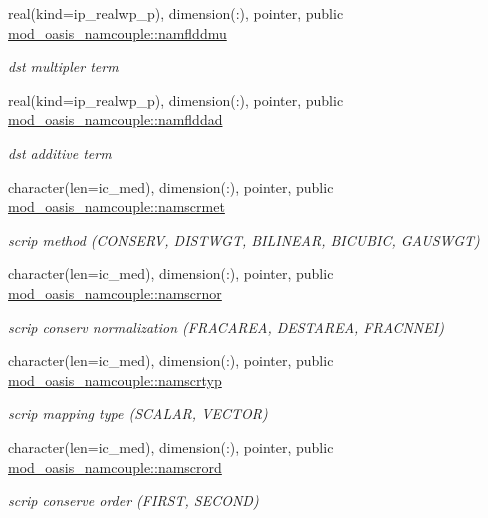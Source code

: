 \begin{DoxyCompactItemize}
real(kind=ip\+\_\+realwp\+\_\+p), dimension(\+:), pointer, public \hyperlink{namespacemod__oasis__namcouple_ad81bb4f19a71f0fcf8655cb9d39a3380}{mod\+\_\+oasis\+\_\+namcouple\+::namflddmu}
\begin{DoxyCompactList}\small\item\em dst multipler term \end{DoxyCompactList}\item 
real(kind=ip\+\_\+realwp\+\_\+p), dimension(\+:), pointer, public \hyperlink{namespacemod__oasis__namcouple_af1e31f45ea1cd7a7b64a8a7dc2cec4ee}{mod\+\_\+oasis\+\_\+namcouple\+::namflddad}
\begin{DoxyCompactList}\small\item\em dst additive term \end{DoxyCompactList}\item 
character(len=ic\+\_\+med), dimension(\+:), pointer, public \hyperlink{namespacemod__oasis__namcouple_a51c19e0892a72acc3dca2adb046ed175}{mod\+\_\+oasis\+\_\+namcouple\+::namscrmet}
\begin{DoxyCompactList}\small\item\em scrip method (C\+O\+N\+S\+E\+RV, D\+I\+S\+T\+W\+GT, B\+I\+L\+I\+N\+E\+AR, B\+I\+C\+U\+B\+IC, G\+A\+U\+S\+W\+GT) \end{DoxyCompactList}\item 
character(len=ic\+\_\+med), dimension(\+:), pointer, public \hyperlink{namespacemod__oasis__namcouple_a392f40531007d5dcc084e6ad4a393fd7}{mod\+\_\+oasis\+\_\+namcouple\+::namscrnor}
\begin{DoxyCompactList}\small\item\em scrip conserv normalization (F\+R\+A\+C\+A\+R\+EA, D\+E\+S\+T\+A\+R\+EA, F\+R\+A\+C\+N\+N\+EI) \end{DoxyCompactList}\item 
character(len=ic\+\_\+med), dimension(\+:), pointer, public \hyperlink{namespacemod__oasis__namcouple_a8ddbaabd22bbf485888b1df5f3578909}{mod\+\_\+oasis\+\_\+namcouple\+::namscrtyp}
\begin{DoxyCompactList}\small\item\em scrip mapping type (S\+C\+A\+L\+AR, V\+E\+C\+T\+OR) \end{DoxyCompactList}\item 
character(len=ic\+\_\+med), dimension(\+:), pointer, public \hyperlink{namespacemod__oasis__namcouple_ac881ced105604879ada860fabd677481}{mod\+\_\+oasis\+\_\+namcouple\+::namscrord}
\begin{DoxyCompactList}\small\item\em scrip conserve order (F\+I\+R\+ST, S\+E\+C\+O\+ND) \end{DoxyCompactList}\item 

\end{DoxyCompactItemize}
